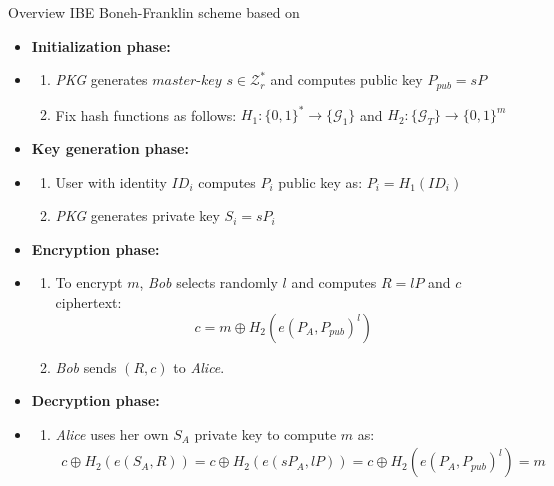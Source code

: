 Overview IBE Boneh-Franklin scheme based on \cite{ecc.fam.param}
\begin{itemize}
    \item \textbf{Initialization phase:}
    \item   \begin{enumerate}
                \item \textit{PKG} generates $\textit{master-key}$ $s\in \mathcal{Z}^{*}_{r}$ and computes public key $P_{pub} = sP$
                \item Fix hash functions as follows: $H_1: \{ 0,1 \}^* \rightarrow \{ \mathcal{G}_1\}$ and $H_2: \{ \mathcal{G}_T\} \rightarrow \{0,1\}^m$
            \end{enumerate}
    \item \textbf{Key generation phase:}
    \item   \begin{enumerate}
                \item User with identity $ID_i$ computes $P_i$ public key as: $P_i = H_1(ID_i)$
                \item \textit{PKG} generates private key $S_i = sP_i$
    \end{enumerate}
    \item \textbf{Encryption phase:}
    \item   \begin{enumerate}
                \item To encrypt $m$, \textit{Bob} selects randomly $l$ and computes $R=lP$ and $c$ ciphertext:
                \begin{equation*} c = m \oplus H_2(e(P_A, P_{pub})^l ) \end{equation*}
                \item \textit{Bob} sends $(R,c)$ to \textit{Alice}.
    \end{enumerate}
    \item \textbf{Decryption phase:}
    \item   \begin{enumerate}
                \item \textit{Alice} uses her own $S_A$ private key to compute $m$ as:
                \begin{eqnarray*} c \oplus H_2(e(S_A, R)) = c \oplus H_2(e(sP_A, lP)) = c \oplus H_2(e(P_A, P_{pub})^l)=m  \end{eqnarray*}
    \end{enumerate}
\end{itemize}



